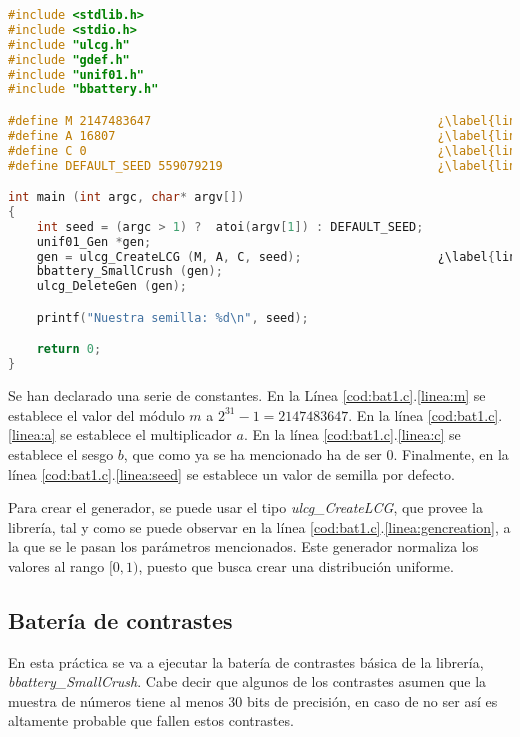 \documentclass{article}
\begin{document}
\begin{lstlisting}[language=C, escapechar=¿,caption={bat1.c}, label={cod:bat1.c}]
#include <stdlib.h>
#include <stdio.h>
#include "ulcg.h"
#include "gdef.h"
#include "unif01.h"
#include "bbattery.h"

#define M 2147483647                                        ¿\label{linea:m}¿
#define A 16807                                             ¿\label{linea:a}¿
#define C 0                                                 ¿\label{linea:c}¿
#define DEFAULT_SEED 559079219                              ¿\label{linea:seed}¿

int main (int argc, char* argv[])
{
    int seed = (argc > 1) ?  atoi(argv[1]) : DEFAULT_SEED;
    unif01_Gen *gen;
    gen = ulcg_CreateLCG (M, A, C, seed);                   ¿\label{linea:gencreation}¿
    bbattery_SmallCrush (gen);
    ulcg_DeleteGen (gen);

    printf("Nuestra semilla: %d\n", seed);

    return 0;
}

\end{lstlisting}

Se han declarado una serie de constantes. En la Línea \ref{cod:bat1.c}.\ref{linea:m} se establece el valor del módulo $m$ a $2^{31}-1=2147483647$. En la línea \ref{cod:bat1.c}.\ref{linea:a} se establece el multiplicador $a$. En la línea \ref{cod:bat1.c}.\ref{linea:c} se establece el sesgo $b$, que como ya se ha mencionado ha de ser $0$. Finalmente, en la línea \ref{cod:bat1.c}.\ref{linea:seed} se establece un valor de semilla por defecto.

Para crear el generador, se puede usar el tipo \emph{ulcg\_CreateLCG}, que provee la librería, tal y como se puede observar en la línea \ref{cod:bat1.c}.\ref{linea:gencreation}, a la que se le pasan los parámetros mencionados. Este generador normaliza los valores al rango $[0,1)$, puesto que busca crear una distribución uniforme.

\subsection{Batería de contrastes}

En esta práctica se va a ejecutar la batería de contrastes básica de la librería, \textit{bbattery\_SmallCrush}. Cabe decir que algunos de los contrastes asumen que la muestra de números tiene al menos 30 bits de precisión, en caso de no ser así es altamente probable que fallen estos contrastes.
\end{document}
